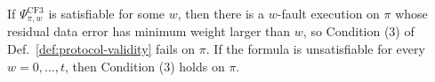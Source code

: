 \documentclass[acmsmall,screen,review,anonymous,nonacm]{acmart}
\begin{document}





If $\Psi^{\mathrm{CF3}}_{\pi,w}$ is satisfiable for some $w$, then there is a
$w$-fault execution on $\pi$ whose residual data error has minimum  weight larger
than $w$, so Condition (3) of Def.~\ref{def:protocol-validity} fails on
$\pi$. If the formula is unsatisfiable for every $w=0,\ldots,t$, then
Condition (3) holds on $\pi$.
\end{document}
